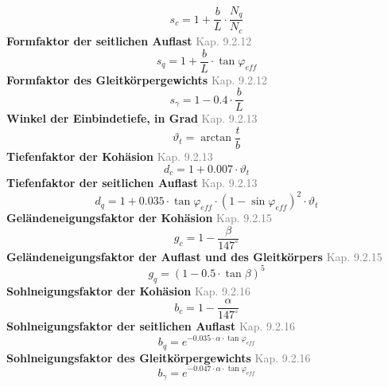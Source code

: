 \documentclass[11pt,a4paper]{article}
\newcommand{\normref}[1]{{\small\textcolor{gray}{#1}}}
\begin{document}
\begin{equation*}
s_c = 1 + \frac{b}{L} \cdot \frac{N_q}{N_c}
\end{equation*}
\noindent\textbf{Formfaktor der seitlichen Auflast} \hfill \normref{Kap. 9.2.12}
\begin{equation*}
s_q = 1 + \frac{b}{L} \cdot \tan \varphi_{eff}
\end{equation*}
\noindent\textbf{Formfaktor des Gleitkörpergewichts} \hfill \normref{Kap. 9.2.12}
\begin{equation*}
s_{\gamma} = 1 - 0.4 \cdot \frac{b}{L}
\end{equation*}
\noindent\textbf{Winkel der Einbindetiefe, in Grad} \hfill \normref{Kap. 9.2.13}
\begin{equation*}
\vartheta_t = \arctan\frac{t}{b}
\end{equation*}
\noindent\textbf{Tiefenfaktor der Kohäsion} \hfill \normref{Kap. 9.2.13}
\begin{equation*}
d_c = 1 + 0.007 \cdot \vartheta_t
\end{equation*}
\noindent\textbf{Tiefenfaktor der seitlichen Auflast} \hfill \normref{Kap. 9.2.13}
\begin{equation*}
d_q = 1 + 0.035 \cdot \tan \varphi_{eff} \cdot \left(1 - \sin \varphi_{eff}\right)^{2} \cdot \vartheta_t
\end{equation*}
\noindent\textbf{Geländeneigungsfaktor der Kohäsion} \hfill \normref{Kap. 9.2.15}
\begin{equation*}
g_c = 1 - \frac{\beta}{147^\circ}
\end{equation*}
\noindent\textbf{Geländeneigungsfaktor der Auflast und des Gleitkörpers} \hfill \normref{Kap. 9.2.15}
\begin{equation*}
g_q = \left(1 - 0.5 \cdot \tan \beta\right)^{5}
\end{equation*}
\noindent\textbf{Sohlneigungsfaktor der Kohäsion} \hfill \normref{Kap. 9.2.16}
\begin{equation*}
b_c = 1 - \frac{\alpha}{147^\circ}
\end{equation*}
\noindent\textbf{Sohlneigungsfaktor der seitlichen Auflast} \hfill \normref{Kap. 9.2.16}
\begin{equation*}
b_q = e^{-0.035 \cdot \alpha \cdot \tan \varphi_{eff}}
\end{equation*}
\noindent\textbf{Sohlneigungsfaktor des Gleitkörpergewichts} \hfill \normref{Kap. 9.2.16}
\begin{equation*}
b_{\gamma} = e^{-0.047 \cdot \alpha \cdot \tan \varphi_{eff}}
\end{equation*}
\end{document}
